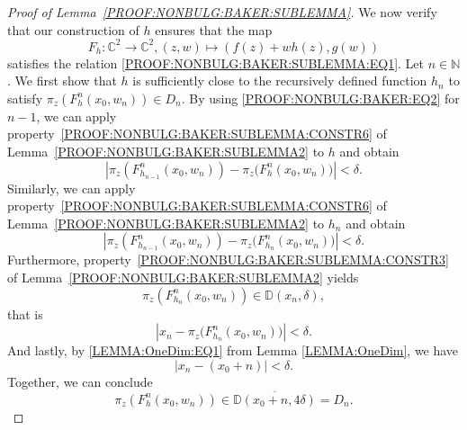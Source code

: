 \documentclass[a4paper, 12pt, twoside]{amsart}
\theoremstyle{definition}
\numberwithin{equation}{section}
\newcommand{\C}{{\mathbb C}}
\newcommand{\D}{{\mathbb D}}
\newcommand{\N}{{\mathbb N}}
\begin{document}
\begin{proof}[Proof of Lemma~\ref{PROOF:NONBULG:BAKER:SUBLEMMA}]
        We now verify that our construction of $h$ ensures that the map
        \begin{equation*}
            F_h : \C^2 \to \C^2, (z,w) \mapsto  (f(z) + wh(z), g(w))
        \end{equation*}
        satisfies the relation \eqref{PROOF:NONBULG:BAKER:SUBLEMMA:EQ1}. 
       Let $n\in\N$. We first show that $h$ is sufficiently close to the recursively defined function $h_n$ to satisfy $ \pi_z( F_h^{n}(x_0, w_n) )\in D_n$. By using \eqref{PROOF:NONBULG:BAKER:EQ2} for $n-1$, we can apply property~\eqref{PROOF:NONBULG:BAKER:SUBLEMMA:CONSTR6} of Lemma~\ref{PROOF:NONBULG:BAKER:SUBLEMMA2} to $h$ and obtain
        \begin{equation*}
            |{\pi_z( F_{h_{n-1}}^n(x_0, w_n)) - \pi_z (F_{h}^n(x_0, w_n)})| < \delta.
        \end{equation*}
        Similarly, we can apply property~\eqref{PROOF:NONBULG:BAKER:SUBLEMMA:CONSTR6} of Lemma~\ref{PROOF:NONBULG:BAKER:SUBLEMMA2} to $h_n$ and obtain
        \begin{equation*}
            |{\pi_z( F_{h_{n-1}}^n(x_0, w_n)) - \pi_z (F_{h_n}^n(x_0, w_n)})| < \delta.
        \end{equation*}
        Furthermore, property~\eqref{PROOF:NONBULG:BAKER:SUBLEMMA:CONSTR3} of Lemma~\ref{PROOF:NONBULG:BAKER:SUBLEMMA2} yields
        \begin{equation*}
            \pi_z( F_{h_n}^n(x_0, w_n)) \in \D(x_n, \delta),
        \end{equation*}
        that is
        \begin{equation*}
            |{x_n - \pi_z( F_{h_n}^n(x_0, w_n)})| < \delta.
        \end{equation*}
        And lastly, by \eqref{LEMMA:OneDim:EQ1} from Lemma \ref{LEMMA:OneDim}, we have
        \begin{equation*}
            |{x_n - (x_0 + n)}| < \delta.
        \end{equation*}
        Together, we can conclude
        \begin{equation}\label{PROOF:NONBULG:BAKER:EQ1}
            \pi_z( F_h^{n}(x_0, w_n) )\in \overline{\D(x_0 + n, 4\delta)} = D_n.
        \end{equation}


\end{proof}
\end{document}
